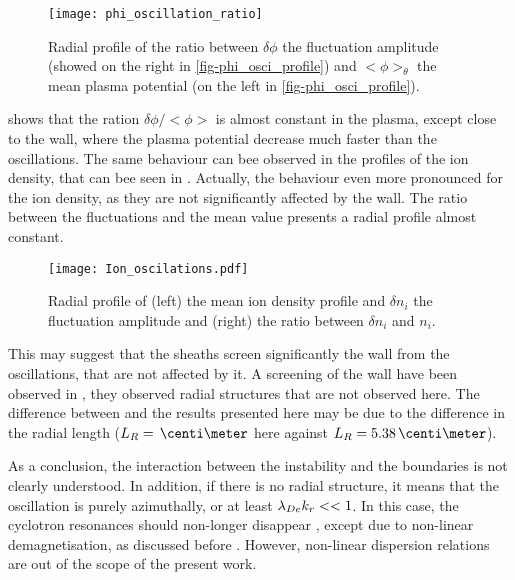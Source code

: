   \begin{figure}[hbtp]
    \centering
    \texttt{[image: phi\_oscillation\_ratio]}
    \caption{Radial profile of the ratio between $\delta \phi$ the fluctuation amplitude (showed on the right in \cref{fig-phi_osci_profile}) and $<\phi>_{\theta}$  the mean plasma potential (on the left in \cref{fig-phi_osci_profile}).}
    \label{fig-ratio}
  \end{figure}
  
   shows that the ration $\delta \phi / <\phi>$ is almost constant in the plasma, except close to the wall, where the plasma potential decrease much faster than the oscillations.
  The same behaviour can bee observed in the profiles of the ion density, that can bee seen in .
  Actually, the behaviour even more pronounced for the ion density, as they are not significantly affected by the wall.
  The ratio between the fluctuations and the mean value presents a radial profile almost constant.
  
  \begin{figure}[hbtp]
    \centering
    \texttt{[image: Ion\_oscilations.pdf]}
    \caption{Radial profile of (left) the mean ion density profile and $\delta n_i$ the fluctuation amplitude and (right) the ratio between $\delta n_i$ and $n_i$.}
    \label{fig-ion_oscilation}
  \end{figure}
  
  \vspace{1em}
  This may suggest that the sheaths screen significantly the wall from the oscillations, that are not affected by it.
  A screening of the wall have been observed in \citet{janhunen2018}, they observed radial structures that are not observed here.
  The difference between  \citet{janhunen2018} and the results presented here may be due to the difference in the radial length ($L_R = \,\centi\meter$ here against $L_R = 5.38\,\centi\meter$).
  
  As a conclusion, the interaction between the instability and the boundaries is not clearly understood.
  In addition, if there is no radial structure, it means that the oscillation is purely azimuthally, or at least $\lambda_{De} k_r <<1$.
  In this case, the cyclotron resonances should non-longer disappear \citep{ducrocq2006}, except due to non-linear demagnetisation, as discussed before \citep{boeuf2018,taccogna2019}.
  However, non-linear dispersion relations are out of the scope of the present work.
  
  

